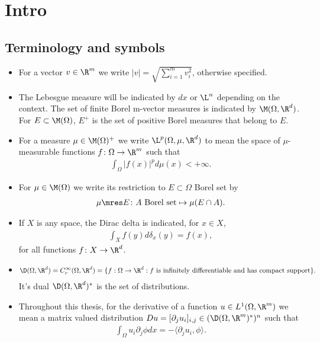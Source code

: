 \section{Intro}

\subsection{Terminology and symbols}

\begin{itemize}
\item For a vector $v\in \R^m$ we write $|v| = \sqrt{\sum_{i=1}^m v_i^2}$, otherwise specified.
\item The Lebesgue measure will be indicated by $dx$ or $\L^n$ depending on the context. The set of finite Borel m-vector measures is indicated by $\M(\Omega,\R^d)$. For $E\subset \M(\Omega)$, $E^+$ is the set of positive Borel measures that belong to $E$.
\item For a measure $\mu\in \M(\Omega)^+$ we write $\L^p(\Omega,\mu,\R^d)$ to mean the space of $\mu$-measurable functions $f \colon \Omega\to \R^m$ such that
\begin{align}
\int_\Omega |f(x)|^pd\mu(x) <+ \infty.
\end{align}
\item For $\mu\in \M(\Omega)$ we write its restriction to $E\subset \Omega$ Borel set by
\begin{align}
\mu\mres E \colon A \text{ Borel set} \mapsto \mu(E\cap A).
\end{align}
\item If $X$ is any space, the Dirac delta is indicated, for $x\in X$,
\begin{align}
\int_X f(y) d\delta_x(y) = f(x),
\end{align}
for all functions $f\colon X\to \R^d$.
\item \begin{align}
\D(\Omega,\R^d) = C^\infty_c(\Omega,\R^d) = \{ f:\Omega\to \R^d: f \text{ is infinitely differentiable and has compact support} \}.
\end{align}
It's dual $\D(\Omega,\R^d)^*$ is the set of distributions.
\item Throughout this thesis, for the derivative of a function $u\in L^1(\Omega,\R^m)$ we mean a matrix valued distribution $Du = [\partial_j u_i]_{i,j} \in (\D(\Omega,\R^m)^*)^n$ such that
\begin{align}
\int_\Omega u_i \partial_j \phi dx = - \langle \partial_j u_i,\phi\rangle.
\end{align}

\end{itemize}

